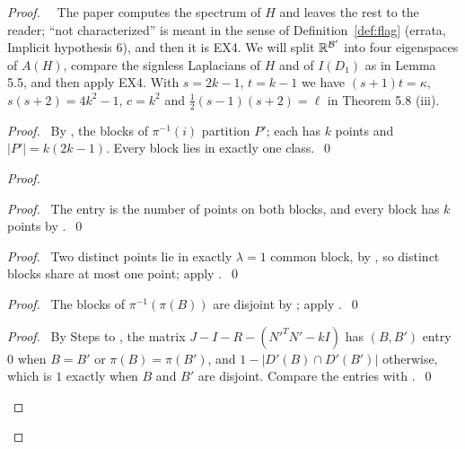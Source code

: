 \begin{proof}
 \pfsketch\ \repair\ The paper computes the spectrum of $H$ and leaves the rest to the reader;
 ``not characterized'' is meant in the sense of Definition~\ref{def:flag} (errata, Implicit
 hypothesis 6), and then it is EX4. We will split ${\mathbb R}^{{\mathcal B}'}$ into four eigenspaces of $A(H)$,
 compare the signless Laplacians of $H$ and of $I(D_1)$ as in Lemma 5.5, and then apply EX4. With
 $s=2k-1$, $t=k-1$ we have $(s+1)t=\kappa$, $s(s+2)=4k^2-1$, $c=k^2$ and
 $\frac12(s-1)(s+2)=\ell$ in Theorem 5.8 (iii).
 \begin{proof}\pf\ By , the blocks of $\pi^{-1}(i)$ partition $P'$; each has $k$
  points and $|P'|=k(2k-1)$. Every block lies in exactly one class.~\qed\end{proof}
 \begin{proof}
  \begin{proof}\pf\ The entry is the number of points on both blocks, and every block has $k$
   points by .~\qed\end{proof}
  \begin{proof}\pf\ Two distinct points lie in exactly $\lambda=1$ common block, by ,
   so distinct blocks share at most one point; apply .~\qed\end{proof}
  \begin{proof}\pf\ The blocks of $\pi^{-1}(\pi(B))$ are disjoint by ; apply
   .~\qed\end{proof}
  \qedstep
  \begin{proof}\pf\ By Steps  to , the matrix
   $J-I-R-(N'^TN'-kI)$ has $(B,B')$ entry $0$ when $B=B'$ or $\pi(B)=\pi(B')$, and
   $1-|D'(B)\cap D'(B')|$ otherwise, which is $1$ exactly when $B$ and $B'$ are disjoint. Compare
   the entries with .~\qed\end{proof}
 \end{proof}

\end{proof}
